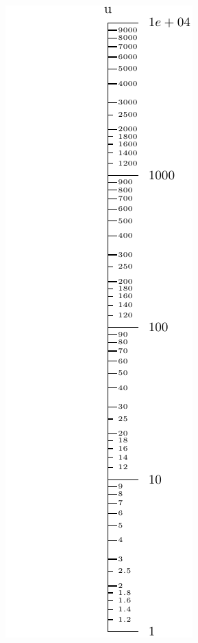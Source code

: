 \documentclass[a4paper,11pt,english]{sphinxmanual}
\begin{document}
\includegraphics{ex_axes_9.pdf}
\end{document}
